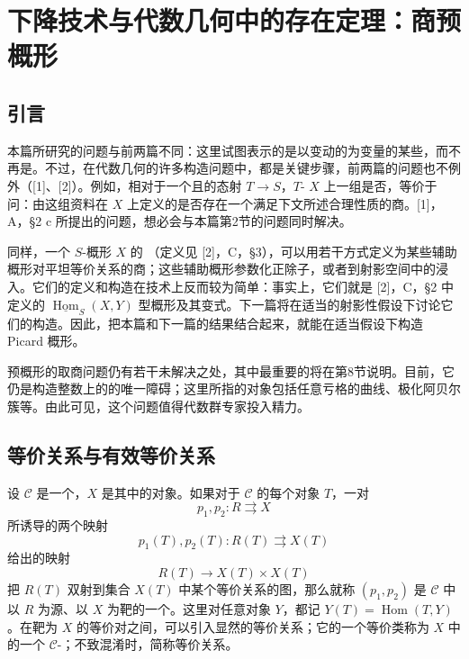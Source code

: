 \chapter{下降技术与代数几何中的存在定理：商预概形}

\section*{引言}
本篇所研究的问题与前两篇不同：这里试图表示的是以变动的为变量的某些，而不再是。不过，在代数几何的许多构造问题中，都是关键步骤，前两篇的问题也不例外（[1]、[2]）。例如，相对于一个且的态射 $T\to S$，$T$- $X$ 上一组是否，等价于问：由这组资料在 $X$ 上定义的是否存在一个满足下文所述合理性质的商。[1]，A，\S2 c 所提出的问题，想必会与本篇第2节的问题同时解决。

同样，一个 $S$-概形 $X$ 的 （定义见 [2]，C，\S3），可以用若干方式定义为某些辅助概形对平坦等价关系的商；这些辅助概形参数化正除子，或者到射影空间中的浸入。它们的定义和构造在技术上反而较为简单：事实上，它们就是 [2]，C，\S2 中定义的 $\underline{\operatorname{Hom}}_S(X,Y)$ 型概形及其变式。下一篇将在适当的射影性假设下讨论它们的构造。因此，把本篇和下一篇的结果结合起来，就能在适当假设下构造 Picard 概形。

预概形的取商问题仍有若干未解决之处，其中最重要的将在第8节说明。目前，它仍是构造整数上的的唯一障碍；这里所指的对象包括任意亏格的曲线、极化阿贝尔簇等。由此可见，这个问题值得代数群专家投入精力。

\section{等价关系与有效等价关系}
设 $\mathcal C$ 是一个，$X$ 是其中的对象。如果对于 $\mathcal C$ 的每个对象 $T$，一对
\[
 p_1,p_2:R\rightrightarrows X
\]
所诱导的两个映射
\[
 p_1(T),p_2(T):R(T)\rightrightarrows X(T)
\]
给出的映射
\[
 R(T)\longrightarrow X(T)\times X(T)
\]
把 $R(T)$ 双射到集合 $X(T)$ 中某个等价关系的图，那么就称 $(p_1,p_2)$ 是 $\mathcal C$ 中以 $R$ 为源、以 $X$ 为靶的一个。这里对任意对象 $Y$，都记 $Y(T)=\operatorname{Hom}(T,Y)$。在靶为 $X$ 的等价对之间，可以引入显然的等价关系；它的一个等价类称为 $X$ 中的一个 $\mathcal C$-；不致混淆时，简称等价关系。


